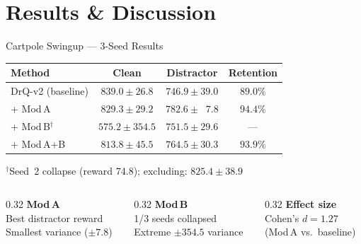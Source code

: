 \documentclass[aspectratio=169]{beamer}
\newcommand{\highlight}[1]{\textcolor{AccentOrange}{\textbf{#1}}}
\newcommand{\good}[1]{\textcolor{SuccessGreen}{\textbf{#1}}}
\newcommand{\bad}[1]{\textcolor{DangerRed}{\textbf{#1}}}
\begin{document}
\section{Results \& Discussion}

\begin{frame}{Cartpole Swingup --- 3-Seed Results}

\begin{table}
\centering
\renewcommand{\arraystretch}{1.2}
\begin{tabular}{l c c c}
\toprule
\textbf{Method} & \textbf{Clean} & \textbf{Distractor} & \textbf{Retention} \\
\midrule
DrQ-v2 (baseline) & $\mathbf{839.0 \pm 26.8}$ & $746.9 \pm 39.0$ & $89.0\%$ \\
\rowcolor{SuccessGreen!20}
+ Mod\,A & $829.3 \pm 29.2$ & $\mathbf{782.6 \pm \;\;7.8}$ & $\mathbf{94.4\%}$ \\
+ Mod\,B$^\dagger$ & $575.2 \pm 354.5$ & $751.5 \pm 29.6$ & --- \\
+ Mod\,A+B & $813.8 \pm 45.5$ & $764.5 \pm 30.3$ & $93.9\%$ \\
\bottomrule
\end{tabular}
\end{table}

{\footnotesize $^\dagger$Seed~2 collapse (reward 74.8); excluding: $825.4 \pm 38.9$}

\vspace{0.5em}
\begin{columns}[c]
\begin{column}{0.32\textwidth}
\centering
\good{Mod\,A}\\
{\small Best distractor reward\\Smallest variance ($\pm 7.8$)}
\end{column}
\begin{column}{0.32\textwidth}
\centering
\bad{Mod\,B}\\
{\small 1/3 seeds collapsed\\Extreme $\pm 354.5$ variance}
\end{column}
\begin{column}{0.32\textwidth}
\centering
\highlight{Effect size}\\
{\small Cohen's $d = 1.27$\\(Mod\,A vs.\ baseline)}
\end{column}
\end{columns}
\end{frame}
\end{document}

